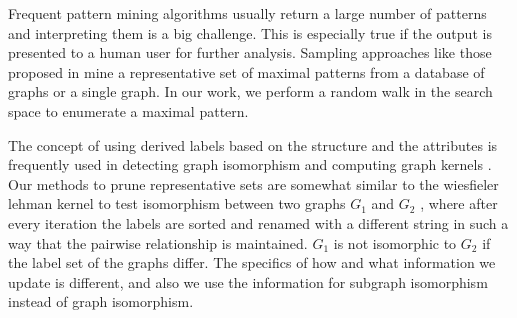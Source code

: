 Frequent pattern mining algorithms usually return a large number of
patterns and interpreting them is a big challenge. This is especially
true if the output is presented to a human user for further analysis.
Sampling approaches like those proposed in
\cite{2009-graphsampling,2011-icdm,RAM2008} mine a representative set of
maximal patterns from a database of graphs or a single graph. 
In our work, we perform a random walk in the search space
to enumerate a maximal pattern.

The concept of using derived labels based on the
structure and the attributes is frequently used in detecting graph
isomorphism \cite{zampelli} and computing graph kernels
\cite{shervashidzeJmlr,shervashidzeNips}. 
Our methods to prune representative sets are somewhat similar to
the wiesfieler lehman kernel to test isomorphism between two graphs
$G_1$ and $G_2$ \cite{weisfeiler}, where after every iteration the labels are
sorted and renamed with a different string in such a way that the pairwise
relationship is maintained. $G_1$ is not isomorphic to $G_2$ 
if the label set of the graphs differ. The specifics of how and what
information we update is different, and also we use the information for
subgraph isomorphism instead of graph isomorphism.

